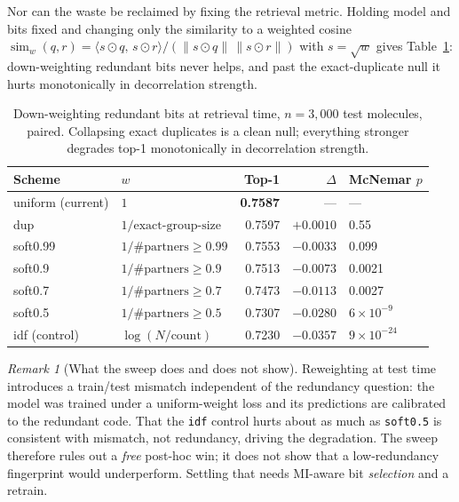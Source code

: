 \documentclass[11pt]{article}
\theoremstyle{plain}
\theoremstyle{remark}
\newtheorem*{remark}{Remark}
\newcommand{\ip}[2]{\langle #1,\, #2\rangle}
\newcommand{\norm}[1]{\lVert #1 \rVert}
\newcommand{\code}[1]{\texttt{\small #1}}
\begin{document}
Nor can the waste be reclaimed by fixing the retrieval metric. Holding model
and bits fixed and changing only the similarity to a weighted cosine
$\operatorname{sim}_w(q,r) = \ip{s \odot q}{s \odot r}/(\norm{s \odot q}\,\norm{s \odot r})$
with $s = \sqrt{w}$ gives Table~\ref{tab:reweight}: down-weighting redundant
bits never helps, and past the exact-duplicate null it hurts monotonically in
decorrelation strength.

\begin{table}[htbp]
\centering
\small
\caption{Down-weighting redundant bits at retrieval time, $n = 3{,}000$ test
molecules, paired. Collapsing exact duplicates is a clean null; everything
stronger degrades top-1 monotonically in decorrelation strength.}
\label{tab:reweight}
\begin{tabular}{@{}l l r r l@{}}
\toprule
Scheme & $w$ & Top-1 & $\Delta$ & McNemar $p$ \\
\midrule
uniform (current) & $1$ & \textbf{0.7587} & --- & --- \\
dup & $1/\text{exact-group-size}$ & 0.7597 & $+0.0010$ & 0.55 \\
soft0.99 & $1/\#\text{partners} \ge 0.99$ & 0.7553 & $-0.0033$ & 0.099 \\
soft0.9 & $1/\#\text{partners} \ge 0.9$ & 0.7513 & $-0.0073$ & 0.0021 \\
soft0.7 & $1/\#\text{partners} \ge 0.7$ & 0.7473 & $-0.0113$ & 0.0027 \\
soft0.5 & $1/\#\text{partners} \ge 0.5$ & 0.7307 & $-0.0280$ & $6\times10^{-9}$ \\
idf (control) & $\log(N/\text{count})$ & 0.7230 & $-0.0357$ & $9\times10^{-24}$ \\
\bottomrule
\end{tabular}
\end{table}

\begin{remark}[What the sweep does and does not show]
Reweighting at test time introduces a train/test mismatch independent of the
redundancy question: the model was trained under a uniform-weight loss and its
predictions are calibrated to the redundant code. That the \code{idf} control
hurts about as much as \code{soft0.5} is consistent with mismatch, not
redundancy, driving the degradation. The sweep therefore rules out a
\emph{free} post-hoc win; it does not show that a low-redundancy fingerprint
would underperform. Settling that needs MI-aware bit \emph{selection} and a
retrain.
\end{remark}
\end{document}
